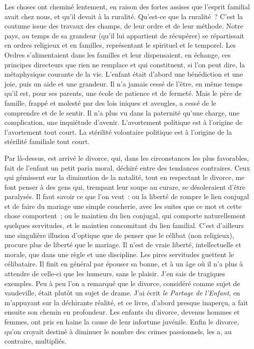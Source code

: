 \documentclass[french,twoside]{book} %
\begin{document}
Les choses ont cheminé lentement, en raison des fortes assises que l’esprit familial avait chez nous, et qu’il devait à la ruralité. Qu’est-ce que la ruralité ? C’est la coutume issue des travaux des champs, de leur ordre et de leur méthode. Notre pays, au temps de sa grandeur (qu’il lui appartient de récupérer) se répartissait en ordres religieux et en familles, représentant le spirituel et le temporel. Les Ordres s’alimentaient dans les familles et leur dispensaient, en échange, ces principes directeurs que rien ne remplace et qui constituent, si l’on peut dire, la métaphysique courante de la vie. L’enfant était d’abord une bénédiction et une joie, puis un aide et une grandeur. Il n’a jamais cessé de l’être, en même temps qu’il est, pour ses parents, une école de patience et de fermeté. Mais le père de famille, frappé et molesté par des lois iniques et aveugles, a cessé de le comprendre et de le sentir. Il n’a plus vu dans la paternité qu’une charge, une complication, une inquiétude d’avenir. L’avortement politique est à l’origine de l’avortement tout court. La stérilité volontaire politique est à l’origine de la stérilité familiale tout court.\par
Par là-dessus, est arrivé le divorce, qui, dans les circonstances les plus favorables, fait de l’enfant un petit paria moral, déchiré entre des tendances contraires. Ceux qui gémissent sur la diminution de la natalité, tout en respectant le divorce, me font penser à des gens qui, trempant leur soupe au curare, se désoleraient d’être paralysés. Il faut savoir ce que l’on veut : ou la liberté de rompre le lien conjugal et de faire du mariage une simple coucherie, avec les suites que ce mot et cette chose comportent ; ou le maintien du lien conjugal, qui comporte naturellement quelques servitudes, et le maintien concomitant du lien familial. C’est d’ailleurs une singulière illusion d’optique que de penser que le célibat (non religieux), procure plus de liberté que le mariage. Il n’est de vraie liberté, intellectuelle et morale, que dans une règle et une discipline. Les pires servitudes guettent le célibataire. Il finit en général par épouser sa bonne, et à un âge où il n’a plus à attendre de celle-ci que les humeurs, sans le plaisir. J’en sais de tragiques exemples. Peu à peu l’on a remarqué que le divorce, considéré comme sujet de vaudeville, était plutôt un sujet de drame. J’ai écrit {\itshape le Partage de l’Enfant}, en m’appuyant sur la déchirante réalité, et ce livre, d’abord presque inaperçu, a fait ensuite son chemin en profondeur. Les enfants du divorce, devenus hommes et femmes, ont pris en haine la cause de leur infortune juvénile. Enfin le divorce, qu’on croyait destiné à diminuer le nombre des crimes passionnels, les a, au contraire, multipliés.\par
\end{document}
